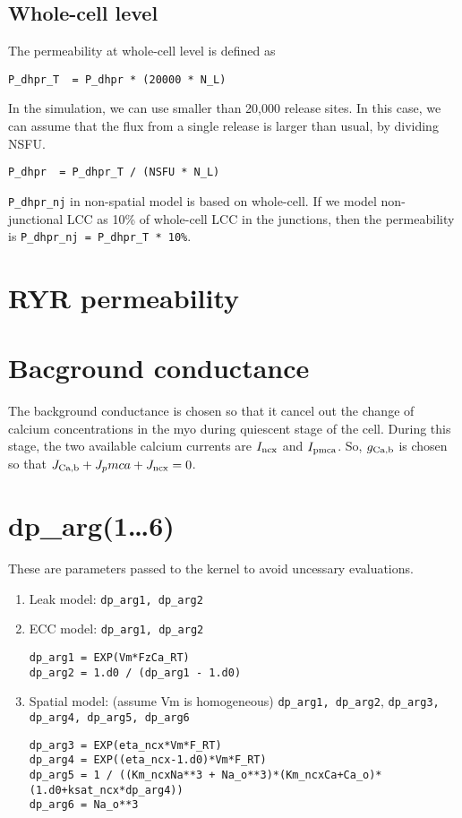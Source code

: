 \subsection{Whole-cell level}
\label{sec:permeab_whole-cell}

The permeability at whole-cell level is defined as
\begin{verbatim}
P_dhpr_T  = P_dhpr * (20000 * N_L) 
\end{verbatim}

In the simulation, we can use smaller than 20,000 release sites. In this case,
we can assume that the flux from a single release is larger than usual, by
dividing NSFU.
\begin{verbatim}
P_dhpr  = P_dhpr_T / (NSFU * N_L) 
\end{verbatim}
\verb!P_dhpr_nj! in non-spatial model is based on whole-cell. If we model
non-junctional LCC as 10\% of whole-cell LCC in the junctions, then the
permeability is \verb!P_dhpr_nj = P_dhpr_T * 10%!.

\section{RYR permeability}	



\section{Bacground conductance}
\label{sec:bacground_conductance}

The background conductance is chosen so that it cancel out the change of calcium
concentrations in the myo during quiescent stage of the cell. During this stage,
the two available calcium currents are $I_{\text{ncx}}$ and $I_{\text{pmca}}$. So, $g_{\text{Ca,b}}$ is
chosen so that $J_{\text{Ca,b}}+J_pmca+J_{\text{ncx}} = 0$.
 

\section{dp\_arg(1\ldots6)}
\label{sec:dp_arg}

These are parameters passed to the kernel to avoid uncessary evaluations. 
\begin{enumerate}
  \item Leak model: \verb!dp_arg1, dp_arg2!
  \item ECC model: \verb!dp_arg1, dp_arg2!
  \begin{verbatim}
dp_arg1 = EXP(Vm*FzCa_RT)
dp_arg2 = 1.d0 / (dp_arg1 - 1.d0)
  \end{verbatim}
  
  \item Spatial model: (assume Vm is homogeneous) \verb!dp_arg1, dp_arg2!,
  \verb!dp_arg3, dp_arg4, dp_arg5, dp_arg6!
  \begin{verbatim}
dp_arg3 = EXP(eta_ncx*Vm*F_RT)
dp_arg4 = EXP((eta_ncx-1.d0)*Vm*F_RT)
dp_arg5 = 1 / ((Km_ncxNa**3 + Na_o**3)*(Km_ncxCa+Ca_o)*(1.d0+ksat_ncx*dp_arg4))
dp_arg6 = Na_o**3
  \end{verbatim}
\end{enumerate}


